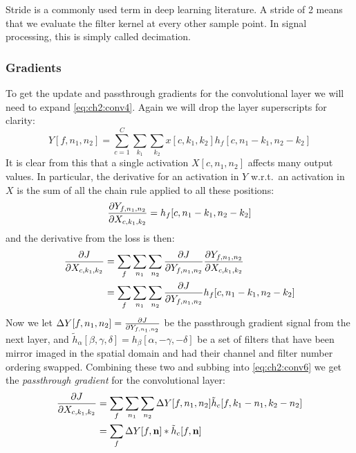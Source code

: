 Stride is a commonly used term in deep learning literature. A stride of 2 means
that we evaluate the filter kernel at every other sample point. In signal
processing, this is simply called decimation.

\subsubsection{Gradients}\label{sec:ch2:conv_grad}
To get the update and passthrough gradients for the convolutional layer we will need to expand
\eqref{eq:ch2:conv4}. Again we will drop the layer superscripts for clarity: 
\begin{equation}
  Y[f, n_1, n_2] = \sum_{c=1}^C \sum_{k_1} \sum_{k_2} x[c, k_1, k_2]
  h_f[c, n_1-k_1, n_2-k_2] \label{eq:ch2:conv5}
\end{equation}
It is clear from this that a single activation $X[c, n_1, n_2]$ affects
many output values. In particular, the derivative for an activation in $Y$
w.r.t.\ an activation in $X$ is the sum of all the chain rule applied to all
these positions:
\begin{equation}
  \frac{\partial Y_{f, n_1, n_2}}{\partial X_{c, k_1, k_2}} = h_f[c, n_1 - k_1, n_2 - k_2]
\end{equation}
and the derivative from the loss is then:
\begin{align}
  \frac{\partial J}{\partial X_{c,k_1,k_2}} &= \sum_f \sum_{n_1} \sum_{n_2} \frac{\partial J}{\partial Y_{f, n_1, n_2}}
  \frac{\partial Y_{f, n_1, n_2}}{\partial X_{c,k_1,k_2}} \\
  &= \sum_f \sum_{n_1} \sum_{n_2} \frac{\partial J}{\partial Y_{f, n_1, n_2}} h_f[c, n_1 - k_1, n_2 - k_2] \label{eq:ch2:conv6}
\end{align}
Now we let $\Delta Y[f, n_1, n_2] = \frac{\partial J}{\partial Y_{f, n_1, n_2}}$ be the passthrough gradient
signal from the next layer, and $\tilde{h}_\alpha[\beta, \gamma, \delta] = h_\beta[\alpha, -\gamma, -\delta]$
be a set of filters that have been mirror imaged in the spatial domain and had
their channel and filter number ordering swapped. Combining these two and
subbing into \eqref{eq:ch2:conv6} we get the \emph{passthrough gradient} for the
convolutional layer:
\begin{align}
  \frac{\partial J}{\partial X_{c,k_1,k_2}} &= \sum_f \sum_{n_1} \sum_{n_2} \Delta Y[f, n_1, n_2] \tilde{h}_c[f, k_1-n_1, k_2-n_2 ] \\
                          &= \sum_f \Delta Y[f, \mathbf{n}] \ast \tilde{h}_c[f, \mathbf{n}]
\end{align}
